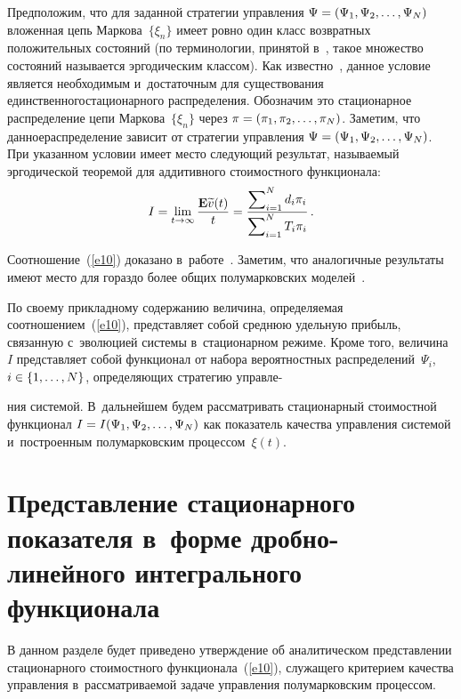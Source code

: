 \begin{multicols}{2}
Предположим, что для заданной стратегии управ\-ле\-ния 
$\Psi\hm=(\Psi_1,\Psi_2,\ldots,\Psi_N)$ вложенная цепь Маркова~$\{\xi_n\}$ 
имеет ровно один класс возвратных положительных состояний (по терминологии, 
принятой в~\cite{8}, такое множество состояний называется эргодическим классом). 
Как известно~\cite[гл.~VIII]{15}, данное условие является необходимым 
и~достаточным для существования единственного\linebreak стационарного распределения. 
Обозначим это стационарное распределение цепи Маркова~$\{\xi_n\}$ через 
$\pi\hm=(\pi_1, \pi_2,\ldots, \pi_N)$. Заметим, что данное\linebreak распределение зависит  
от стратегии управления $\Psi\hm=(\Psi_1,\Psi_2,\ldots,\Psi_N)$. При указанном 
условии имеет место следующий результат, называемый эргодической теоремой 
для аддитивного стоимостного функционала:
\begin{equation}
I=\lim\limits_{t\rightarrow\infty}\displaystyle\frac{\displaystyle \mathbf{E}\widetilde{v}(t)\mathstrut}{\displaystyle t\mathstrut}=
\displaystyle\frac{\displaystyle \sum\nolimits_{i=1}^N d_i\pi_i\mathstrut}{\displaystyle \sum\nolimits_{i=1}^N T_i\pi_i\mathstrut}\,. 
\label{e10}
\end{equation}

Соотношение~(\ref{e10}) доказано в~работе~\cite[гл.~5]{8}. Заметим, что аналогичные 
результаты имеют мес\-то для гораздо более общих полумарковских моделей~\cite{10, 11}.

По своему прикладному содержанию величина, определяемая соотношением~(\ref{e10}), 
представляет собой
среднюю удельную прибыль, связанную с~эволюцией системы в~стационарном
режиме. Кроме того, величина~$I$ представляет собой функционал от
набора вероятностных распределений~$\Psi_{i}$, $i\hm\in\lbrace 1,\ldots
,N\rbrace $, определяющих стратегию управле-\linebreak\vspace*{-12pt}

\pagebreak

\noindent
ния системой. 
В~дальнейшем будем рассматривать стационарный стоимостной функционал 
$I\hm=I(\Psi_{1},\Psi_{2},\ldots , \Psi_{N})$ как
показатель качества управ\-ле\-ния системой и~построенным полумарковским
процессом~$\xi (t)$.

\section{Представление стационарного показателя в~форме
дробно-линейного интегрального функционала}

В данном разделе будет приведено утверждение об аналитическом
представлении стационарного стоимостного функционала~(\ref{e10}), 
служащего критерием качества управления в~рассматриваемой задаче управления 
полумарковским процессом.


\end{multicols}
